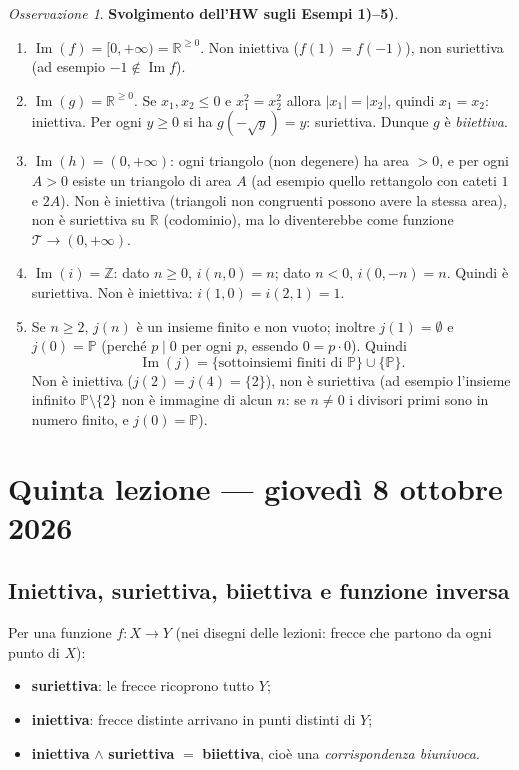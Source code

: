 \documentclass[11pt,a4paper]{article}
\newcommand{\Z}{\mathbb{Z}}
\newcommand{\R}{\mathbb{R}}
\newcommand{\Prim}{\mathbb{P}}
\newcommand{\im}{\operatorname{Im}}
\theoremstyle{definition}
\theoremstyle{plain}
\theoremstyle{remark}
\newtheorem*{osservazione}{Osservazione}
\begin{document}
\begin{osservazione}
\textbf{Svolgimento dell'HW sugli Esempi 1)--5)}. 
\begin{enumerate}[label=\arabic*), itemsep=4pt]
\item $\im(f)=[0,+\infty)=\R^{\ge0}$. Non iniettiva ($f(1)=f(-1)$), non suriettiva (ad esempio $-1\notin\im f$).
\item $\im(g)=\R^{\ge0}$. Se $x_1,x_2\le 0$ e $x_1^2=x_2^2$ allora $|x_1|=|x_2|$, quindi $x_1=x_2$: iniettiva. Per ogni $y\ge0$ si ha $g(-\sqrt{y})=y$: suriettiva. Dunque $g$ \`e \emph{biiettiva}.
\item $\im(h)=(0,+\infty)$: ogni triangolo (non degenere) ha area $>0$, e per ogni $A>0$ esiste un triangolo di area $A$ (ad esempio quello rettangolo con cateti $1$ e $2A$). Non \`e iniettiva (triangoli non congruenti possono avere la stessa area), non \`e suriettiva su $\R$ (codominio), ma lo diventerebbe come funzione $\mathcal{T}\to(0,+\infty)$.
\item $\im(i)=\Z$: dato $n\ge0$, $i(n,0)=n$; dato $n<0$, $i(0,-n)=n$. Quindi \`e suriettiva. Non \`e iniettiva: $i(1,0)=i(2,1)=1$.
\item Se $n\ge2$, $j(n)$ \`e un insieme finito e non vuoto; inoltre $j(1)=\emptyset$ e $j(0)=\Prim$ (perch\'e $p\mid 0$ per ogni $p$, essendo $0=p\cdot0$). Quindi
\[
\im(j)=\{\text{sottoinsiemi finiti di }\Prim\}\cup\{\Prim\}.
\]
Non \`e iniettiva ($j(2)=j(4)=\{2\}$), non \`e suriettiva (ad esempio l'insieme infinito $\Prim\setminus\{2\}$ non \`e immagine di alcun $n$: se $n\neq0$ i divisori primi sono in numero finito, e $j(0)=\Prim$).
\end{enumerate}
\end{osservazione}

\section{Quinta lezione --- gioved\`i 8 ottobre 2026}

\subsection{Iniettiva, suriettiva, biiettiva e funzione inversa}

Per una funzione $f\colon X\to Y$ (nei disegni delle lezioni: frecce che partono da ogni punto di $X$):
\begin{itemize}
\item \textbf{suriettiva}: le frecce ricoprono tutto $Y$;
\item \textbf{iniettiva}: frecce distinte arrivano in punti distinti di $Y$;
\item \textbf{iniettiva} $\wedge$ \textbf{suriettiva} $=$ \textbf{biiettiva}, cio\`e una \emph{corrispondenza biunivoca}.
\end{itemize}
\end{document}
